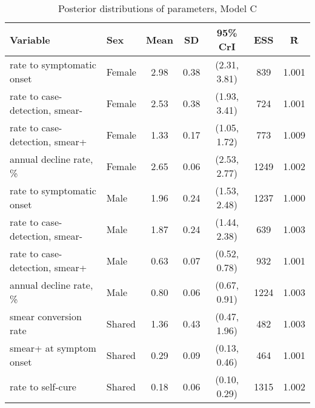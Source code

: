 \begin{table}[h]

\caption{\label{tab:}Posterior distributions of parameters, Model C}
\centering
\begin{tabular}[t]{llccccc}
\toprule
Variable & Sex & Mean & SD & 95\% CrI & ESS & \^{R}\\
\midrule
rate to symptomatic onset & Female & 2.98 & 0.38 & (2.31, 3.81) & 839 & 1.001\\
rate to case-detection, smear- & Female & 2.53 & 0.38 & (1.93, 3.41) & 724 & 1.001\\
rate to case-detection, smear+ & Female & 1.33 & 0.17 & (1.05, 1.72) & 773 & 1.009\\
annual decline rate, \% & Female & 2.65 & 0.06 & (2.53, 2.77) & 1249 & 1.002\\
\addlinespace
rate to symptomatic onset & Male & 1.96 & 0.24 & (1.53, 2.48) & 1237 & 1.000\\
rate to case-detection, smear- & Male & 1.87 & 0.24 & (1.44, 2.38) & 639 & 1.003\\
rate to case-detection, smear+ & Male & 0.63 & 0.07 & (0.52, 0.78) & 932 & 1.001\\
annual decline rate, \% & Male & 0.80 & 0.06 & (0.67, 0.91) & 1224 & 1.003\\
\addlinespace
smear conversion rate & Shared & 1.36 & 0.43 & (0.47, 1.96) & 482 & 1.003\\
smear+ at symptom onset & Shared & 0.29 & 0.09 & (0.13, 0.46) & 464 & 1.001\\
rate to self-cure & Shared & 0.18 & 0.06 & (0.10, 0.29) & 1315 & 1.002\\
\bottomrule
\end{tabular}
\end{table}

